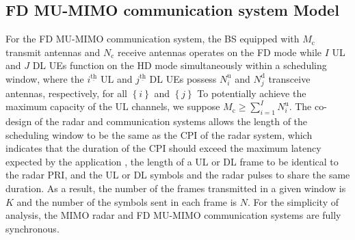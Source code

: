\documentclass[9pt,journal]{IEEEtran}
\newcommand{\braces}[1]{{\left\{ {#1}\right\}}}
\newcommand{\ith}[1]    {{#1}^{\underline{\text{th}}}}
\newcommand{\cc}{_\mathrm{c}}
\begin{document}
\subsection{FD MU-MIMO communication system Model}
For the FD MU-MIMO communication system, the BS equipped with $\mathit{M}_\textrm{c}$ transmit antennas and $\mathit{N}_{\textrm{c}}$ receive antennas operates on the FD mode while $\mathit{I}$ UL and $\mathit{J}$ DL UEs function on the HD mode simultaneously within a scheduling window, where the $\ith{i}$ UL and $\ith{j}$ DL UEs possess $\mathit{N}^{\textrm{u}}_i$ and $\mathit{N}^{\textrm{d}}_j$ transceive antennas, respectively, for all $\braces{i}$ and $\braces{j}$ %
To potentially achieve the maximum capacity of the UL channels, we suppose $\mathit{M}\cc\geq\sum_{i=1}^{\mathit{I}}\mathit{N}^{\textrm{u}}_i$\cite{MIMOcom}. The co-design of the radar and communication systems allows the length of the scheduling window to be the same as the CPI of the radar system, which indicates that the duration of the CPI should exceed the maximum latency expected by the application \cite{ShiftMIMO}, the length of a UL or DL frame to be identical to the radar PRI, and the UL or DL symbols and the radar pulses to share the same duration. As a result, the number of the frames transmitted in a given window is $\mathit{K}$ and the number of the symbols sent in each frame is $\mathit{N}$. For the simplicity of analysis, the MIMO radar and FD MU-MIMO communication systems are fully synchronous\cite{MCMIMO_RadComm}. 
\end{document}
